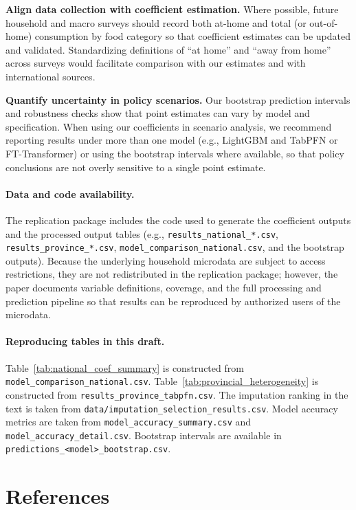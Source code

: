 \documentclass[12pt,a4paper]{article}
\begin{document}
\textbf{Align data collection with coefficient estimation.} Where possible, future household and macro surveys should record both at-home and total (or out-of-home) consumption by food category so that coefficient estimates can be updated and validated. Standardizing definitions of ``at home'' and ``away from home'' across surveys would facilitate comparison with our estimates and with international sources.

\textbf{Quantify uncertainty in policy scenarios.} Our bootstrap prediction intervals and robustness checks show that point estimates can vary by model and specification. When using our coefficients in scenario analysis, we recommend reporting results under more than one model (e.g., LightGBM and TabPFN or FT-Transformer) or using the bootstrap intervals where available, so that policy conclusions are not overly sensitive to a single point estimate.

\paragraph{Data and code availability.} The replication package includes the code used to generate the coefficient outputs and the processed output tables (e.g., \texttt{results\_national\_*.csv}, \texttt{results\_province\_*.csv}, \texttt{model\_comparison\_national.csv}, and the bootstrap outputs). Because the underlying household microdata are subject to access restrictions, they are not redistributed in the replication package; however, the paper documents variable definitions, coverage, and the full processing and prediction pipeline so that results can be reproduced by authorized users of the microdata.

\paragraph{Reproducing tables in this draft.} Table~\ref{tab:national_coef_summary} is constructed from \texttt{model\_comparison\_national.csv}. Table~\ref{tab:provincial_heterogeneity} is constructed from \texttt{results\_province\_tabpfn.csv}. The imputation ranking in the text is taken from \texttt{data/imputation\_selection\_results.csv}. Model accuracy metrics are taken from \texttt{model\_accuracy\_summary.csv} and \texttt{model\_accuracy\_detail.csv}. Bootstrap intervals are available in \texttt{predictions\_<model>\_bootstrap.csv}.

\section*{References}



\end{document}

